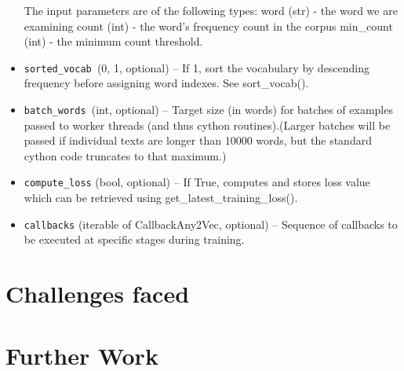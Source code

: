 \begin{itemize}
    The input parameters are of the following types:
            word (str) - the word we are examining
            count (int) - the word’s frequency count in the corpus
            min\_count (int) - the minimum count threshold.

  \item  \texttt{sorted\_vocab }({0, 1}, optional) – If 1, sort the vocabulary by descending frequency before assigning word indexes. See sort\_vocab().
 \item   \texttt{batch\_words }(int, optional) – Target size (in words) for batches of examples passed to worker threads (and thus cython routines).(Larger batches will be passed if individual texts are longer than 10000 words, but the standard cython code truncates to that maximum.)
  \item  \texttt{compute\_loss} (bool, optional) – If True, computes and stores loss value which can be retrieved using get\_latest\_training\_loss().
 \item   \texttt{callbacks} (iterable of CallbackAny2Vec, optional) – Sequence of callbacks to be executed at specific stages during training.

\end{itemize}





\section{Challenges faced}
\section{Further Work}